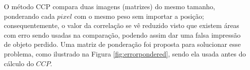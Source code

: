 O método CCP compara duas imagens (matrizes) do mesmo tamanho, 
ponderando cada $pixel$ com o mesmo peso sem importar a posição; 
consequentemente, o valor da correlação se vê reduzido visto que existem áreas 
com erro sendo usadas na comparação,
podendo assim dar uma falsa impressão de objeto perdido. 
Uma matriz de ponderação foi proposta para solucionar esse problema, como ilustrado na 
Figura \ref{fig:errorpondered}, sendo
ela usada antes do cálculo do $CCP$.

